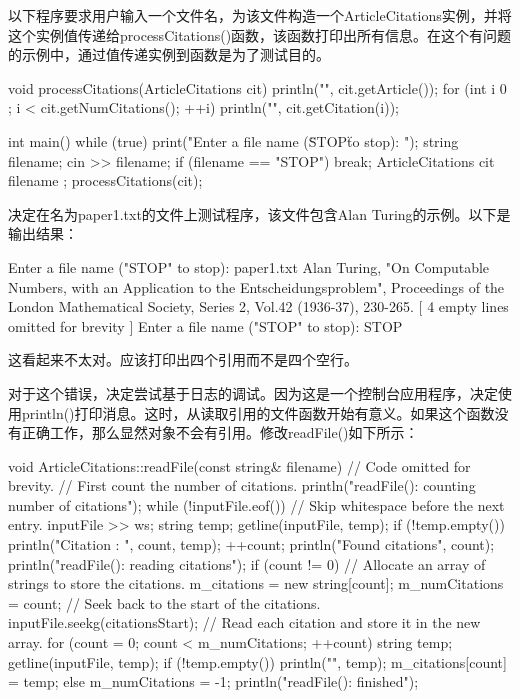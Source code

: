 
以下程序要求用户输入一个文件名，为该文件构造一个ArticleCitations实例，并将这个实例值传递给processCitations()函数，该函数打印出所有信息。在这个有问题的示例中，通过值传递实例到函数是为了测试目的。

\begin{cpp}
void processCitations(ArticleCitations cit)
{
    println("{}", cit.getArticle());
    for (int i { 0 }; i < cit.getNumCitations(); ++i) {
        println("{}", cit.getCitation(i));
    }
}

int main()
{
    while (true) {
        print("Enter a file name (\"STOP\" to stop): ");
        string filename;
        cin >> filename;
        if (filename == "STOP") { break; }
        ArticleCitations cit { filename };
        processCitations(cit);
    }
}
\end{cpp}

决定在名为paper1.txt的文件上测试程序，该文件包含Alan Turing的示例。以下是输出结果：

\begin{shell}
Enter a file name ("STOP" to stop): paper1.txt
Alan Turing, "On Computable Numbers, with an Application to the
Entscheidungsproblem", Proceedings of the London Mathematical Society, Series 2,
Vol.42 (1936-37), 230-265.
[ 4 empty lines omitted for brevity ]
Enter a file name ("STOP" to stop): STOP
\end{shell}

这看起来不太对。应该打印出四个引用而不是四个空行。


对于这个错误，决定尝试基于日志的调试。因为这是一个控制台应用程序，决定使用println()打印消息。这时，从读取引用的文件函数开始有意义。如果这个函数没有正确工作，那么显然对象不会有引用。修改readFile()如下所示：

\begin{cpp}
void ArticleCitations::readFile(const string& filename)
{
    // Code omitted for brevity.
    // First count the number of citations.
    println("readFile(): counting number of citations");
    while (!inputFile.eof()) {
        // Skip whitespace before the next entry.
        inputFile >> ws;
        string temp;
        getline(inputFile, temp);
        if (!temp.empty()) {
            println("Citation {}: {}", count, temp);
            ++count;
        }
        }
        println("Found {} citations", count);
        println("readFile(): reading citations");
        if (count != 0) {
        // Allocate an array of strings to store the citations.
        m_citations = new string[count];
        m_numCitations = count;
        // Seek back to the start of the citations.
        inputFile.seekg(citationsStart);
        // Read each citation and store it in the new array.
        for (count = 0; count < m_numCitations; ++count) {
            string temp;
            getline(inputFile, temp);
            if (!temp.empty()) {
                println("{}", temp);
                m_citations[count] = temp;
            }
        }
    } else {
        m_numCitations = -1;
    }
    println("readFile(): finished");
}
\end{cpp}

